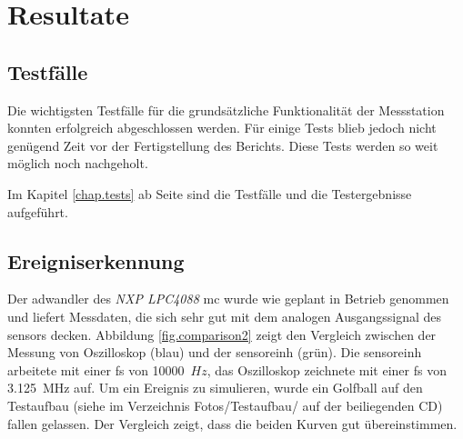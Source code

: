 %
%

\chapter{Resultate}\label{chap.resultate}

\section{Testfälle}
Die wichtigsten Testfälle für die grundsätzliche Funktionalität der Messstation konnten erfolgreich abgeschlossen werden. Für einige Tests blieb jedoch nicht genügend Zeit vor der Fertigstellung des Berichts. Diese Tests werden so weit möglich noch nachgeholt.

Im Kapitel \ref{chap.tests} ab Seite \pageref{chap.tests} sind die Testfälle und die Testergebnisse aufgeführt.

\section{Ereigniserkennung}
Der \gls{adwandler} des \emph{NXP LPC4088} \gls{mc} wurde wie geplant in Betrieb genommen und liefert Messdaten, die sich sehr gut mit dem analogen Ausgangssignal des \gls{sensor}s decken. Abbildung \ref{fig.comparison2} zeigt den Vergleich zwischen der Messung von Oszilloskop (blau) und der \gls{sensoreinh} (grün). Die \gls{sensoreinh} arbeitete mit einer \gls{fs} von 10000~\ensuremath{Hz}, das Oszilloskop zeichnete mit einer \gls{fs} von 3.125~MHz auf. Um ein Ereignis zu simulieren, wurde ein Golfball auf den Testaufbau (siehe im Verzeichnis Fotos/Testaufbau/ auf der beiliegenden CD) fallen gelassen. Der Vergleich zeigt, dass die beiden Kurven gut übereinstimmen. 

